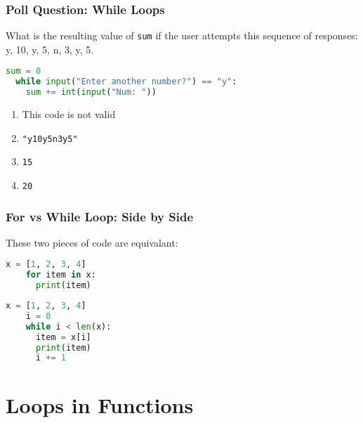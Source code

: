 \documentclass{beamer}
\begin{document}
%
%
\begin{frame}[fragile]
  \frametitle{Poll Question: While Loops}
  What is the resulting value of \lstinline|sum| if the user attempts this sequence of responses: y, 10, y, 5, n, 3, y, 5.
  \begin{lstlisting}[language=Python, autogobble]
  sum = 0
  while input("Enter another number?") == "y":
    sum += int(input("Num: "))
  \end{lstlisting}
  \vfill
  \begin{enumerate}[A]
    \item This code is not valid 
    \item \lstinline|"y10y5n3y5"|
    \item \lstinline|15|
    \item \lstinline|20|
  \end{enumerate}
\end{frame}

%
%
\begin{frame}[fragile]
  \frametitle{For vs While Loop: Side by Side}
  These two pieces of code are equivalant:
  \begin{minipage}{0.48\textwidth}
    \begin{lstlisting}[language=Python, autogobble]
    x = [1, 2, 3, 4]
    for item in x:
      print(item)
    \end{lstlisting}
  \end{minipage}
  \hfill
  \begin{minipage}{0.48\textwidth}
    \begin{lstlisting}[language=Python, autogobble]
    x = [1, 2, 3, 4]
    i = 0
    while i < len(x):
      item = x[i]
      print(item)
      i += 1
    \end{lstlisting}
  \end{minipage}
\end{frame}



\section{Loops in Functions}
\end{document}

